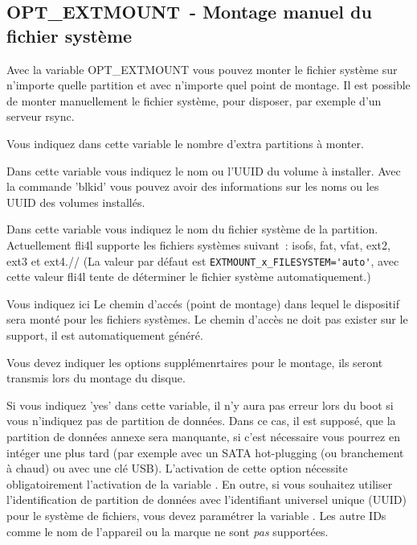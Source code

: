 \subsection {OPT\_EXTMOUNT~- Montage manuel du fichier système}

    Avec la variable OPT\_EXTMOUNT vous pouvez monter le fichier système sur
    n'importe quelle partition et avec n'importe quel point de montage. Il est
    possible de monter manuellement le fichier système, pour disposer, par
    exemple d’un serveur rsync.

\begin{description}

    Vous indiquez dans cette variable le nombre d’extra partitions à monter.


    Dans cette variable vous indiquez le nom ou l'UUID du
    volume à installer. Avec la commande 'blkid' vous pouvez avoir des
    informations sur les noms ou les UUID des volumes installés.


    Dans cette variable vous indiquez le nom du fichier système de la partition.
    Actuellement fli4l supporte les fichiers systèmes suivant~: isofs, fat,
    vfat, ext2, ext3 et ext4.//
    (La valeur par défaut est \verb*?EXTMOUNT_x_FILESYSTEM='auto'?, avec cette
    valeur fli4l tente de déterminer le fichier système automatiquement.)


    Vous indiquez ici Le chemin d'accés (point de montage) dans lequel le
    dispositif sera monté pour les fichiers systèmes. Le chemin d'accès ne doit
    pas exister sur le support, il est automatiquement généré.


    Vous devez indiquer les options supplémenrtaires pour le montage, ils
    seront transmis lors du montage du disque.


	Si vous indiquez 'yes' dans cette variable, il n'y aura pas erreur lors
	du boot si vous n'indiquez pas de partition de données. Dans ce cas, il est
	supposé, que la partition de données annexe sera manquante, si c'est nécessaire
	vous pourrez en intéger une plus tard (par exemple avec un SATA hot-plugging
	(ou branchement à chaud) ou avec une clé USB). L'activation de cette option
	nécessite obligatoirement l'activation de la variable .
	En outre, si vous souhaitez utiliser l'identification de partition de données avec
	l'identifiant universel unique (UUID) pour le système de fichiers, vous devez
	paramétrer la variable . Les autre IDs comme
	le nom de l'appareil ou la marque ne sont \emph{pas} supportées.

\end{description}

